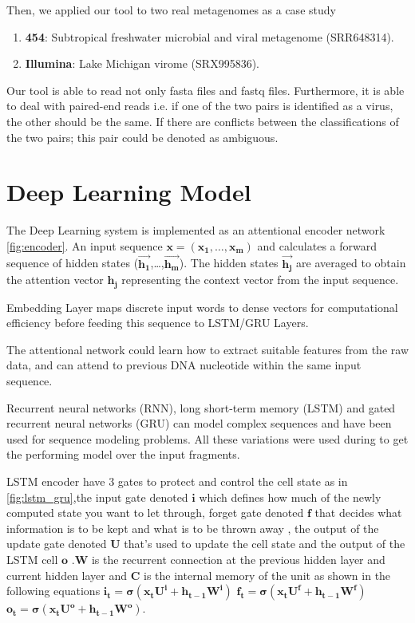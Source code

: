\documentclass[conference]{IEEEtran}
\begin{document}
Then, we applied our tool to two real metagenomes as a case study
\begin{enumerate}
	\item \textbf{454}: Subtropical freshwater microbial and viral metagenome (SRR648314).\
	\item \textbf{Illumina}: Lake Michigan virome (SRX995836).
\end{enumerate}

Our tool is able to read not only fasta files and fastq files. Furthermore, it is able to deal with paired-end reads i.e. if one of the two pairs is identified as a virus, the other should be the same. If there are conflicts between the classifications of the two pairs; this pair could be denoted as ambiguous.

\section{Deep Learning Model}
The Deep Learning system is implemented as an attentional encoder network  \ref{fig:encoder}. An input sequence  $\mathbf{x = (x_{1} , \ldots{} , x_{m} )}$  and calculates a forward sequence of hidden states  ($\mathbf{\overrightarrow{h_{1}}}$,\ldots{},$\mathbf{ \overrightarrow{h_{m}}}$). The hidden states $\mathbf{\overrightarrow{h_{j}}}$  are averaged to obtain the attention vector $\mathbf{h_{j}}$ representing the context vector from the input sequence.

Embedding Layer maps discrete input words to dense vectors for computational efficiency before feeding this sequence to LSTM/GRU Layers.


The attentional network could learn how to extract suitable features from the raw data, and can attend to previous DNA nucleotide within the same input sequence. 

Recurrent neural networks (RNN), long short-term memory (LSTM) \cite{hochreiter1997long} and gated recurrent neural networks (GRU) \cite{chung2014empirical} can model complex sequences and have been used for sequence modeling problems. All these variations were used during to get the performing model over the input fragments. 

LSTM encoder have 3 gates to protect and control the cell state as in \ref{fig:lstm_gru},the input gate denoted $\mathbf{i}$ which defines how much of the newly computed state you want to let through, forget gate denoted $\mathbf{f}$ that decides what information is to be kept and what is to be thrown away ,  the output of the update gate denoted $\mathbf{U}$ that's used to update the cell state and the output of the LSTM cell $\mathbf{o}$ .$\mathbf{W}$ is the recurrent connection at the previous hidden layer and current hidden layer and $\mathbf{C}$ is the internal memory of the unit  as shown in the following equations \newline
$\mathbf{i_{t}=\sigma(x_{t}U^i + h_{t-1}W^i)}$ \newline
$\mathbf{f_{t}=\sigma(x_{t}U^f + h_{t-1}W^f)}$ \newline
$\mathbf{o_{t}=\sigma(x_{t}U^o + h_{t-1}W^o)}$. 
\end{document}
